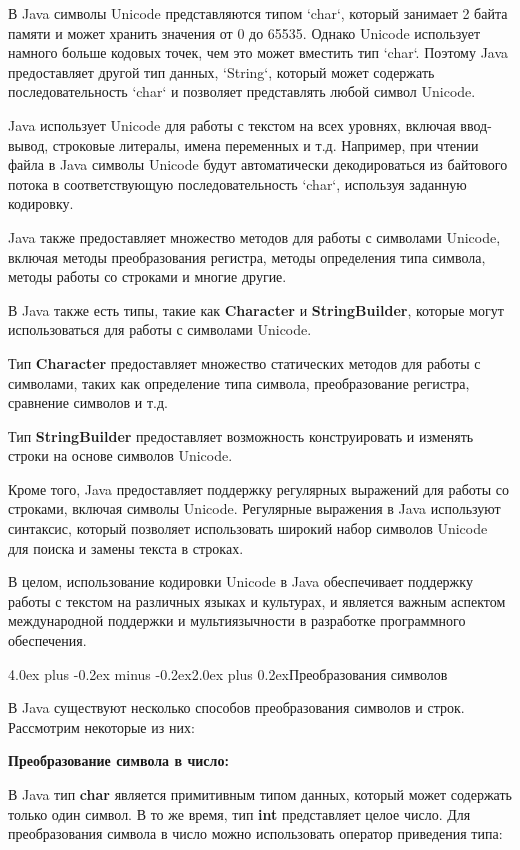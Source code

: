 \documentclass[12pt, a4paper]{book}%
\makeatletter
\renewcommand{\section}{\@startsection{section}{1}{1pt}%
{4.0ex plus -0.2ex minus -0.2ex}{2.0ex plus 0.2ex}{\centering\bf}}%
\makeatother
\begin{document}
{В Java символы Unicode представляются типом `char`, который занимает 2 байта памяти и может хранить значения от 0 до 65535. Однако Unicode использует намного больше кодовых точек, чем это может вместить тип `char`. Поэтому Java предоставляет другой тип данных, `String`, который может содержать последовательность `char` и позволяет представлять любой символ Unicode.

Java использует Unicode для работы с текстом на всех уровнях, включая ввод-вывод, строковые литералы, имена переменных и т.д. Например, при чтении файла в Java символы Unicode будут автоматически декодироваться из байтового потока в соответствующую последовательность `char`, используя заданную кодировку.

Java также предоставляет множество методов для работы с символами Unicode, включая методы преобразования регистра, методы определения типа символа, методы работы со строками и многие другие.

В Java также есть типы, такие как {\bf Character} и {\bf StringBuilder}, которые могут использоваться для работы с символами Unicode. 

Тип {\bf Character} предоставляет множество статических методов для работы с символами, таких как определение типа символа, преобразование регистра, сравнение символов и т.д. 

Тип {\bf StringBuilder} предоставляет возможность конструировать и изменять строки на основе символов Unicode.

Кроме того, Java предоставляет поддержку регулярных выражений для работы со строками, включая символы Unicode. Регулярные выражения в Java используют синтаксис, который позволяет использовать широкий набор символов Unicode для поиска и замены текста в строках.

В целом, использование кодировки Unicode в Java обеспечивает поддержку работы с текстом на различных языках и культурах, и является важным аспектом международной поддержки и мультиязычности в разработке программного обеспечения.

\section{Преобразования символов}

В Java существуют несколько способов преобразования символов и строк. Рассмотрим некоторые из них:

{\bf Преобразование символа в число:}

В Java тип {\bf char} является примитивным типом данных, который может содержать только один символ. В то же время, тип {\bf int} представляет целое число. Для преобразования символа в число можно использовать оператор приведения типа:

}
\end{document}
